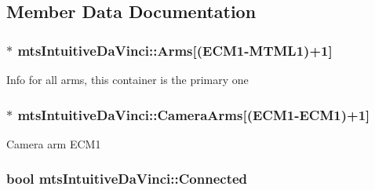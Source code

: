 \subsection{Member Data Documentation}
\hypertarget{classmts_intuitive_da_vinci_a66c7aafdf43dc2172bc4b7e7e880046a}{}
\subsubsection[{Arms}]{$\ast$ mts\+Intuitive\+Da\+Vinci\+::\+Arms\mbox{[}({\bf E\+C\+M1}-\/{\bf M\+T\+M\+L1})+1\mbox{]}\hspace{0.3cm}{\ttfamily [protected]}}\label{classmts_intuitive_da_vinci_a66c7aafdf43dc2172bc4b7e7e880046a}
Info for all arms, this container is the primary one \hypertarget{classmts_intuitive_da_vinci_a3b0838b5bce0e66ac94c4e9425f55001}{}
\subsubsection[{Camera\+Arms}]{$\ast$ mts\+Intuitive\+Da\+Vinci\+::\+Camera\+Arms\mbox{[}({\bf E\+C\+M1}-\/{\bf E\+C\+M1})+1\mbox{]}\hspace{0.3cm}{\ttfamily [protected]}}\label{classmts_intuitive_da_vinci_a3b0838b5bce0e66ac94c4e9425f55001}
Camera arm E\+C\+M1 \hypertarget{classmts_intuitive_da_vinci_a92486c3be7e1f07ef72df2f00556a5c7}{}
\subsubsection[{Connected}]{\setlength{\rightskip}{0pt plus 5cm}bool mts\+Intuitive\+Da\+Vinci\+::\+Connected\hspace{0.3cm}{\ttfamily [protected]}}\label{classmts_intuitive_da_vinci_a92486c3be7e1f07ef72df2f00556a5c7}
\hypertarget{classmts_intuitive_da_vinci_a653cc20fc11e9d3717a825fa1d4bebb7}{}

